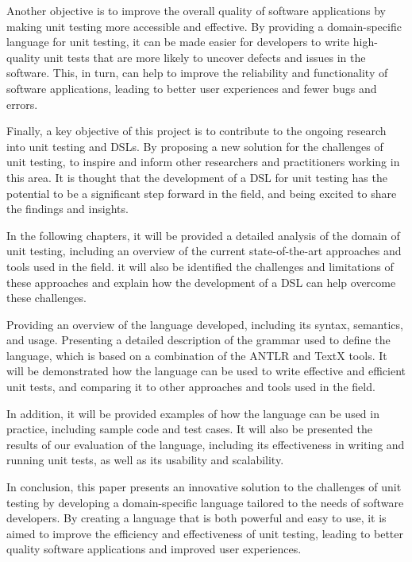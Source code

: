 Another objective is to improve the overall quality of software applications by making unit testing more accessible and effective. By providing a domain-specific language for unit testing, it can be made easier for developers to write high-quality unit tests that are more likely to uncover defects and issues in the software. This, in turn, can help to improve the reliability and functionality of software applications, leading to better user experiences and fewer bugs and errors.

Finally, a key objective of this project is to contribute to the ongoing research into unit testing and DSLs. By proposing a new solution for the challenges of unit testing, to inspire and inform other researchers and practitioners working in this area. It is thought that the development of a DSL for unit testing has the potential to be a significant step forward in the field, and being excited to share the findings and insights.

In the following chapters, it will be provided a detailed analysis of the domain of unit testing, including an overview of the current state-of-the-art approaches and tools used in the field. it will also be identified the challenges and limitations of these approaches and explain how the development of a DSL can help overcome these challenges.

Providing an overview of the language developed, including its syntax, semantics, and usage. Presenting a detailed description of the grammar used to define the language, which is based on a combination of the ANTLR and TextX tools. It will be demonstrated how the language can be used to write effective and efficient unit tests, and comparing it to other approaches and tools used in the field.

In addition, it will be provided examples of how the language can be used in practice, including sample code and test cases. It will also be presented the results of our evaluation of the language, including its effectiveness in writing and running unit tests, as well as its usability and scalability.

In conclusion, this paper presents an innovative solution to the challenges of unit testing by developing a domain-specific language tailored to the needs of software developers. By creating a language that is both powerful and easy to use, it is aimed to improve the efficiency and effectiveness of unit testing, leading to better quality software applications and improved user experiences.